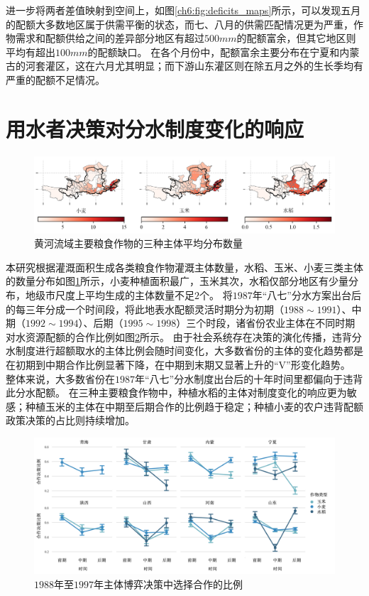 进一步将两者差值映射到空间上，如图\ref{ch6:fig:deficits_maps}所示，可以发现五月的配额大多数地区属于供需平衡的状态，而七、八月的供需匹配情况更为严重，作物需求和配额供给之间的差异部分地区有超过$500mm$的配额富余，但其它地区则平均有超出$100mm$的配额缺口。
在各个月份中，配额富余主要分布在宁夏和内蒙古的河套灌区，这在六月尤其明显；而下游山东灌区则在除五月之外的生长季均有严重的配额不足情况。

\section{用水者决策对分水制度变化的响应}

\begin{figure}[htb]
    \centering
    \includegraphics[width=\textwidth]{img/ch6/ch6_agents.png}
    \caption{黄河流域主要粮食作物的三种主体平均分布数量}\label{ch6:fig:agents}
\end{figure}

本研究根据灌溉面积生成各类粮食作物灌溉主体数量，水稻、玉米、小麦三类主体的数量分布如图\ref{ch6:fig:agents}所示，小麦种植面积最广，玉米其次，水稻仅部分地区有少量分布，地级市尺度上平均生成的主体数量不足$2$个。
将$1987$年“八七”分水方案出台后的每三年分成一个时间段，将此地表水配额灵活时期分为初期（$1988 \sim 1991$）、中期（$1992 \sim 1994$）、后期（$1995 \sim 1998$）三个时段，诸省份农业主体在不同时期对水资源配额的合作比例如图\ref{ch6:fig:compliacne}所示。
由于社会系统存在决策的演化传播，违背分水制度进行超额取水的主体比例会随时间变化，大多数省份的主体的变化趋势都是在初期到中期合作比例显著下降，在中期到末期又显著上升的“V”形变化趋势。
整体来说，大多数省份在$1987$年“八七”分水制度出台后的十年时间里都偏向于违背此分水配额。
在三种主要粮食作物中，种植水稻的主体对制度变化的响应更为敏感；种植玉米的主体在中期至后期合作的比例趋于稳定；种植小麦的农户违背配额政策决策的占比则持续增加。


\begin{figure}[htb]
    \centering
    \includegraphics[width=\textwidth]{img/ch6/ch6_compliance.png}
    \caption{$1988$年至$1997$年主体博弈决策中选择合作的比例}\label{ch6:fig:compliacne}
\end{figure}

